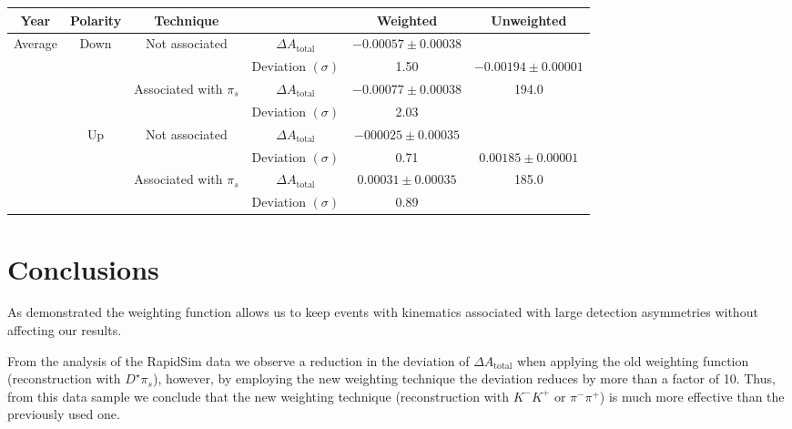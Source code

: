 \documentclass{article}
\begin{document}
        \begin{center}
                \begin{tabular}{c|c|c|c|c|c}
                        Year & Polarity & Technique & & Weighted & Unweighted\\
                        \hline\hline
                        \multirow{8}{*}{Average} & \multirow{4}{*}{Down} & \multirow{2}{*}{Not associated} & $\Delta A_\text{total}$ & $-0.00057\pm 0.00038$& \\
                        & & & Deviation $(\sigma)$ & 1.50 & $-0.00194\pm 0.00001$\\
                        \cline{3-5}
                        & & \multirow{2}{*}{Associated with $\pi_s$} & $\Delta A_\text{total}$ & $-0.00077\pm 0.00038$& 194.0\\
                        & & & Deviation $(\sigma)$ & 2.03& \\
                        \cline{2-6}
                        & \multirow{4}{*}{Up} & \multirow{2}{*}{Not associated} & $\Delta A_\text{total}$ & $-000025\pm 0.00035$& \\
                        & & & Deviation $(\sigma)$ & 0.71& $0.00185\pm 0.00001$\\
                        \cline{3-5}
                        & & \multirow{2}{*}{Associated with $\pi_s$} & $\Delta A_\text{total}$ & $0.00031\pm 0.00035$& 185.0\\
                        & & & Deviation $(\sigma)$ & 0.89& \\
                \end{tabular}
                \label{tab:average}
        \end{center}

        \section{Conclusions}
        As demonstrated the weighting function allows us to keep events with kinematics associated with large detection asymmetries without affecting our results.

        From the analysis of the RapidSim data we observe a reduction in the deviation of $\Delta A_\text{total}$ when applying the old weighting function (reconstruction with $D^\star\pi_s$), however, by employing the new weighting technique the deviation reduces by more than a factor of 10.
        Thus, from this data sample we conclude that the new weighting technique (reconstruction with $K^-K^+ \text{ or } \pi^-\pi^+$) is much more effective than the previously used one.
\end{document}
